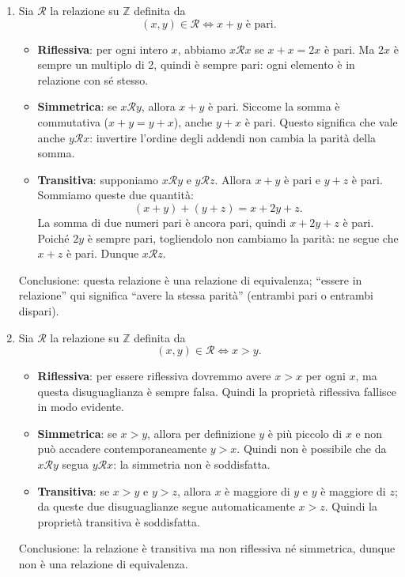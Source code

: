 \begin{esempio}
\begin{enumerate}
\item Sia \(\mathcal{R}\) la relazione su \(\mathbb{Z}\) definita da
\[
(x,y)\in\mathcal{R} \iff x+y \text{ è pari}.
\]
\begin{itemize}
\item \textbf{Riflessiva}: per ogni intero \(x\), abbiamo \(x\mathcal{R}x\) se \(x+x=2x\) è pari.
      Ma \(2x\) è sempre un multiplo di 2, quindi è sempre pari: ogni elemento è in relazione con sé stesso.
\item \textbf{Simmetrica}: se \(x\mathcal{R}y\), allora \(x+y\) è pari. Siccome la somma è commutativa
      (\(x+y=y+x\)), anche \(y+x\) è pari. Questo significa che vale anche \(y\mathcal{R}x\):
      invertire l’ordine degli addendi non cambia la parità della somma.
\item \textbf{Transitiva}: supponiamo \(x\mathcal{R}y\) e \(y\mathcal{R}z\). Allora \(x+y\) è pari e \(y+z\) è pari.
      Sommiamo queste due quantità:
      \[
      (x+y)+(y+z) = x + 2y + z.
      \]
      La somma di due numeri pari è ancora pari, quindi \(x+2y+z\) è pari. Poiché \(2y\) è sempre pari,
      togliendolo non cambiamo la parità: ne segue che \(x+z\) è pari. Dunque \(x\mathcal{R}z\).
\end{itemize}
Conclusione: questa relazione è una relazione di equivalenza; “essere in relazione” qui significa
“avere la stessa parità” (entrambi pari o entrambi dispari).

\item Sia \(\mathcal{R}\) la relazione su \(\mathbb{Z}\) definita da
\[
(x,y)\in\mathcal{R} \iff x>y.
\]
\begin{itemize}
    \item \textbf{Riflessiva}: per essere riflessiva dovremmo avere \(x>x\) per ogni \(x\), ma questa disuguaglianza
          è sempre falsa. Quindi la proprietà riflessiva fallisce in modo evidente.
    \item \textbf{Simmetrica}: se \(x>y\), allora per definizione \(y\) è più piccolo di \(x\) e non può accadere
          contemporaneamente \(y>x\). Quindi non è possibile che da \(x\mathcal{R}y\) segua \(y\mathcal{R}x\):
          la simmetria non è soddisfatta.
    \item \textbf{Transitiva}: se \(x>y\) e \(y>z\), allora \(x\) è maggiore di \(y\) e \(y\) è maggiore di \(z\);
          da queste due disuguaglianze segue automaticamente \(x>z\). Quindi la proprietà transitiva è soddisfatta.
\end{itemize}
Conclusione: la relazione è transitiva ma non riflessiva né simmetrica, dunque non è una relazione di equivalenza.
\end{enumerate}
\end{esempio}















